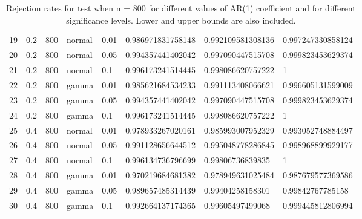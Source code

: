 \begin{table}[ht]
\begin{tabular}{rlllllll}
  19 & 0.2 & 800 & normal & 0.01 & 0.986971831758148 & 0.992109581308136 & 0.997247330858124 \\ 
  20 & 0.2 & 800 & normal & 0.05 & 0.994357441402042 & 0.997090447515708 & 0.999823453629374 \\ 
  21 & 0.2 & 800 & normal & 0.1 & 0.996173241514445 & 0.998086620757222 & 1 \\ 
  22 & 0.2 & 800 & gamma & 0.01 & 0.985621684534233 & 0.991113408066621 & 0.996605131599009 \\ 
  23 & 0.2 & 800 & gamma & 0.05 & 0.994357441402042 & 0.997090447515708 & 0.999823453629374 \\ 
  24 & 0.2 & 800 & gamma & 0.1 & 0.996173241514445 & 0.998086620757222 & 1 \\ 
  25 & 0.4 & 800 & normal & 0.01 & 0.978933267020161 & 0.985993007952329 & 0.993052748884497 \\ 
  26 & 0.4 & 800 & normal & 0.05 & 0.991128656644512 & 0.995048778286845 & 0.998968899929177 \\ 
  27 & 0.4 & 800 & normal & 0.1 & 0.996134736796699 & 0.99806736839835 & 1 \\ 
  28 & 0.4 & 800 & gamma & 0.01 & 0.970219684681382 & 0.978949631025484 & 0.987679577369586 \\ 
  29 & 0.4 & 800 & gamma & 0.05 & 0.989657485314439 & 0.99404258158301 & 0.99842767785158 \\ 
  30 & 0.4 & 800 & gamma & 0.1 & 0.992664137174365 & 0.99605497499068 & 0.999445812806994 \\ 
   \hline
\end{tabular}
\caption{Rejection rates for test when n = 800 for 
                   different values of AR(1) coefficient and for different 
                   significance levels. Lower and upper bounds are also 
                   included.} 
\label{table:rr_800}
\end{table}

